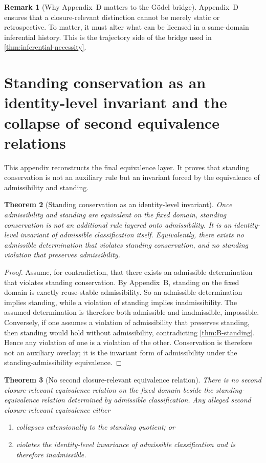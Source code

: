 \documentclass[11pt]{article}
\theoremstyle{plain}
\newtheorem{theorem}{Theorem}[section]
\theoremstyle{definition}
\newtheorem{remark}[theorem]{Remark}
\begin{document}
\begin{remark}[Why Appendix~D matters to the G\"odel bridge]
Appendix~D ensures that a closure-relevant distinction cannot be merely static or retrospective. To matter, it must alter what can be licensed in a same-domain inferential history. This is the trajectory side of the bridge used in \cref{thm:inferential-necessity}.
\end{remark}

\section{Standing conservation as an identity-level invariant and the collapse of second equivalence relations}
\label{app:equivalence}

This appendix reconstructs the final equivalence layer. It proves that standing conservation is not an auxiliary rule but an invariant forced by the equivalence of admissibility and standing.

\begin{theorem}[Standing conservation as an identity-level invariant]
\label{thm:E-conservation}
Once admissibility and standing are equivalent on the fixed domain, standing conservation is not an additional rule layered onto admissibility. It is an identity-level invariant of admissible classification itself. Equivalently, there exists no admissible determination that violates standing conservation, and no standing violation that preserves admissibility.
\end{theorem}

\begin{proof}
Assume, for contradiction, that there exists an admissible determination that violates standing conservation. By Appendix~B, standing on the fixed domain is exactly reuse-stable admissibility. So an admissible determination implies standing, while a violation of standing implies inadmissibility. The assumed determination is therefore both admissible and inadmissible, impossible. Conversely, if one assumes a violation of admissibility that preserves standing, then standing would hold without admissibility, contradicting \cref{thm:B-standing}. Hence any violation of one is a violation of the other. Conservation is therefore not an auxiliary overlay; it is the invariant form of admissibility under the standing-admissibility equivalence.
\end{proof}

\begin{theorem}[No second closure-relevant equivalence relation]
\label{thm:E-no-second-equivalence}
There is no second closure-relevant equivalence relation on the fixed domain beside the standing-equivalence relation determined by admissible classification. Any alleged second closure-relevant equivalence either
\begin{enumerate}[label=(\roman*), leftmargin=2.5em]
    \item collapses extensionally to the standing quotient; or
    \item violates the identity-level invariance of admissible classification and is therefore inadmissible.
\end{enumerate}
\end{theorem}
\end{document}
